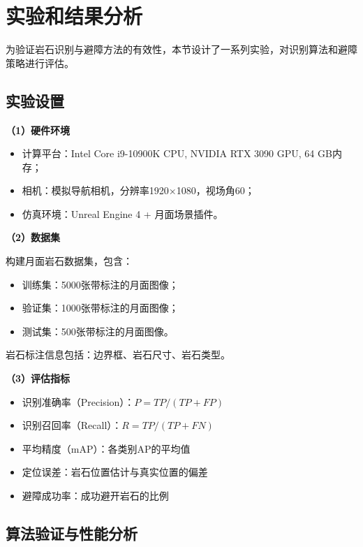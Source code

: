 \section{实验和结果分析}
\label{sec:ch5_experiments}

为验证岩石识别与避障方法的有效性，本节设计了一系列实验，对识别算法和避障策略进行评估。

\subsection{实验设置}
\label{subsec:ch5_setup}

\textbf{（1）硬件环境}

\begin{itemize}
    \item 计算平台：Intel Core i9-10900K CPU, NVIDIA RTX 3090 GPU, 64 GB内存；
    \item 相机：模拟导航相机，分辨率1920×1080，视场角60\degree；
    \item 仿真环境：Unreal Engine 4 + 月面场景插件。
\end{itemize}

\textbf{（2）数据集}

构建月面岩石数据集，包含：
\begin{itemize}
    \item 训练集：5000张带标注的月面图像；
    \item 验证集：1000张带标注的月面图像；
    \item 测试集：500张带标注的月面图像。
\end{itemize}

岩石标注信息包括：边界框、岩石尺寸、岩石类型。

\textbf{（3）评估指标}

\begin{itemize}
    \item 识别准确率（Precision）：$P = TP / (TP + FP)$
    \item 识别召回率（Recall）：$R = TP / (TP + FN)$
    \item 平均精度（mAP）：各类别AP的平均值
    \item 定位误差：岩石位置估计与真实位置的偏差
    \item 避障成功率：成功避开岩石的比例
\end{itemize}

\subsection{算法验证与性能分析}
\label{subsec:ch5_results}


